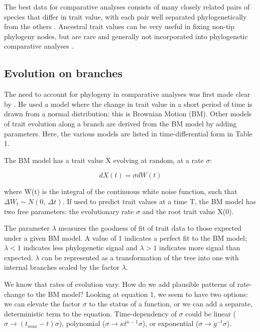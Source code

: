 \documentclass[12pt]{article}
\begin{document}
The best data for comparative analyses consists of many closely related pairs of species that differ in trait value, with each pair well separated phylogenetically from the others \citep{garland_phylogenetic_2005}. Ancestral trait values can be very useful in fixing non-tip phylogeny nodes, but are rare and generally not incorporated into phylogenetic comparative analyses \citep{harmon_early_2010}. 

\subsection{Evolution on branches}

The need to account for phylogeny in comparative analyses was first made clear by \citet{felsenstein_phylogenies_1985}. He used a model where the change in trait value in a short period of time is drawn from a normal distribution: this is Brownian Motion (BM). Other models of trait evolution along a branch are derived from the BM model by adding parameters. Here, the various models are listed in time-differential form in Table 1. 

The BM model has a trait value X evolving at random, at a rate $\sigma$:

\begin{equation}
	dX(t) = \sigma dW(t)
\end{equation}

where W(t) is the integral of the continuous white noise function, such that $ \Delta W_t \sim N(0, ~\Delta t)$. If used to predict trait values at a time T, the BM model has two free parameters: the evolutionary rate $\sigma$ and the root trait value X(0).

The parameter $\lambda$ \citep{pagel_inferring_1997,pagel_inferring_1999} measures the goodness of fit of trait data to those expected under a given BM model.  A value of 1 indicates a perfect fit to the BM model; $\lambda<1$ indicates less phylogenetic signal and $\lambda>1$ indicates more signal than expected. 
$\lambda$ can be represented as a transformation of the tree into one with internal branches scaled by the factor $\lambda$.

We know that rates of evolution vary. How do we add plausible patterns of rate-change to the BM model? Looking at equation 1, we seem to have two options: we can elevate the factor $\sigma$ to the status of a function, or we can add a separate, deterministic term to the equation. Time-dependency of $\sigma$ could be linear ($ \sigma \rightarrow (t_{max}-t)\sigma$), polynomial ($ \sigma \rightarrow  \kappa t^{\kappa - 1} \sigma $), or exponential ($ \sigma  \rightarrow g^{-t} \sigma $). 
\end{document}
